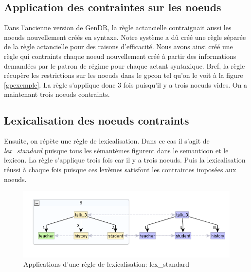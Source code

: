 \subsection{Application des contraintes sur les noe{}uds}
Dans l'ancienne version de GenDR, la règle actancielle contraignait aussi les noe{}uds nouvellement créés en syntaxe. Notre système a dû créé une règle séparée de la règle actancielle pour des raisons d'efficacité. Nous avons ainsi créé une règle qui contraints chaque noe{}ud nouvellement créé à partir des informations demandées par le patron de régime pour chaque actant syntaxique. Bref, la règle récupère les restrictions sur les noe{}uds dans le gpcon tel qu'on le voit à la figure \ref{gpexemple}. La règle s'applique donc 3 fois puisqu'il y a trois noe{}uds vides. On a maintenant trois noe{}uds contraints.

\subsection{Lexicalisation des noe{}uds contraints}
Ensuite, on répète une règle de lexicalisation. Dans ce cas il s'agit de \emph{lex\_standard} puisque tous les sémantèmes figurent dans le semanticon et le lexicon. La règle s'applique trois fois car il y a trois noe{}uds. Puis la lexicalisation réussi à chaque fois puisque ces lexèmes satisfont les contraintes imposées aux noe{}uds.
\begin{figure}[htb]
	\centering
	\includegraphics[width=1\textwidth, trim = {0cm 0cm 0cm 0cm},clip]{ch6/figs/lex.png}
	\caption{Applications d'une règle de lexicalisation: lex\_standard}
	\label{deroulement3}
\end{figure}

